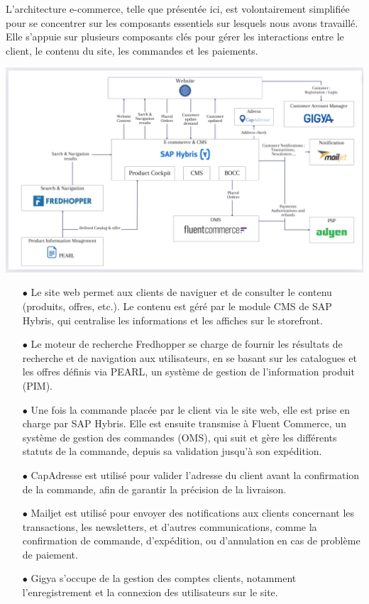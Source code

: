 L'architecture e-commerce, telle que présentée ici, est volontairement simplifiée pour se concentrer sur les composants essentiels sur lesquels nous avons travaillé. Elle s’appuie sur plusieurs composants clés pour gérer les interactions entre le client, le contenu du site, les commandes et les paiements.
\begin{center}
    \centering
    \includegraphics[width=19cm]{Figures/architectureGlobale.png}
    \label{fig:processus}
\end{center}
\begin{itemize}
    \item [$\bullet$]Le site web permet aux clients de naviguer et de consulter le contenu (produits, offres, etc.). Le contenu est géré par le module CMS de SAP Hybris, qui centralise les informations et les affiches sur le storefront.
    \item [$\bullet$]Le moteur de recherche Fredhopper se charge de fournir les résultats de recherche et de navigation aux utilisateurs, en se basant sur les catalogues et les offres définis via PEARL, un système de gestion de l'information produit (PIM).
    \item [$\bullet$]Une fois la commande placée par le client via le site web, elle est prise en charge par SAP Hybris. Elle est ensuite transmise à Fluent Commerce, un système de gestion des commandes (OMS), qui suit et gère les différents statuts de la commande, depuis sa validation jusqu’à son expédition.
    \item [$\bullet$]CapAdresse est utilisé pour valider l’adresse du client avant la confirmation de la commande, afin de garantir la précision de la livraison.
    \item [$\bullet$]Mailjet est utilisé pour envoyer des notifications aux clients concernant les transactions, les newsletters, et d'autres communications, comme la confirmation de commande, d’expédition, ou d’annulation en cas de problème de paiement.
    \item [$\bullet$]Gigya s’occupe de la gestion des comptes clients, notamment l’enregistrement et la connexion des utilisateurs sur le site.
\end{itemize}
